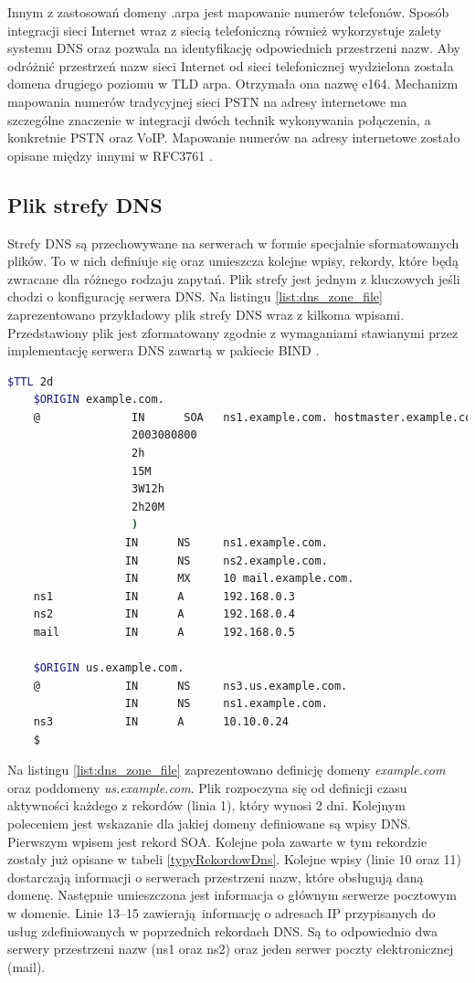 Innym z zastosowań domeny .arpa jest mapowanie numerów telefonów. Sposób integracji sieci Internet wraz z siecią telefoniczną również
wykorzystuje zalety systemu DNS oraz pozwala na identyfikację odpowiednich przestrzeni nazw. Aby odróżnić przestrzeń nazw sieci
Internet od sieci telefonicznej wydzielona została domena drugiego poziomu w TLD arpa. Otrzymała ona nazwę e164. Mechanizm mapowania
numerów tradycyjnej sieci
PSTN na adresy internetowe ma szczególne znaczenie w integracji dwóch technik wykonywania połączenia, a konkretnie PSTN oraz VoIP.
Mapowanie numerów na adresy internetowe zostało opisane między innymi w RFC3761 \cite{RFC3761}.

\subsection{Plik strefy DNS}
Strefy DNS są przechowywane na serwerach w formie specjalnie sformatowanych plików. To w nich definiuje się oraz umieszcza kolejne
wpisy, rekordy, które będą zwracane dla różnego rodzaju zapytań. Plik strefy jest jednym z kluczowych jeśli chodzi o konfigurację
serwera DNS. Na listingu \ref{list:dns_zone_file} zaprezentowano przykładowy plik strefy DNS wraz z kilkoma wpisami. Przedstawiony
plik jest zformatowany zgodnie z wymaganiami stawianymi przez implementację serwera DNS zawartą w pakiecie
BIND \cite{Liu:2006:DB:1197828, isc, domain_example}.

\begin{lstlisting}[label={list:dns_zone_file},captionpos=b,caption=Przykładowy plik strefy DNS.,language=bash]
	$TTL 2d
	$ORIGIN example.com.
	@              IN      SOA   ns1.example.com. hostmaster.example.com. (
	               2003080800
	               2h
	               15M
	               3W12h
	               2h20M
	               )
	              IN      NS     ns1.example.com.
	              IN      NS     ns2.example.com.
	              IN      MX     10 mail.example.com.
	ns1           IN      A      192.168.0.3
	ns2           IN      A      192.168.0.4
	mail          IN      A      192.168.0.5

	$ORIGIN us.example.com.
	@             IN      NS     ns3.us.example.com.
	              IN      NS     ns1.example.com.
	ns3           IN      A      10.10.0.24
	$
\end{lstlisting}

Na listingu \ref{list:dns_zone_file} zaprezentowano definicję domeny \textit{example.com} oraz poddomeny \textit{us.example.com}.
Plik rozpoczyna się od definicji czasu aktywności każdego z rekordów (linia 1), który wynosi 2 dni. Kolejnym poleceniem jest
wskazanie dla jakiej domeny definiowane są wpisy DNS. Pierwszym wpisem jest rekord SOA. Kolejne pola zawarte w tym rekordzie
zostały już opisane w tabeli \ref{typyRekordowDns}. Kolejne wpisy (linie 10 oraz 11) dostarczają informacji o serwerach przestrzeni
nazw, które obsługują daną domenę. Następnie umieszczona jest informacja o głównym serwerze pocztowym w domenie. Linie 13--15
zawierają informację o adresach IP przypisanych do usług zdefiniowanych w poprzednich rekordach DNS. Są to odpowiednio dwa serwery
przestrzeni nazw (ns1 oraz ns2) oraz jeden serwer poczty elektronicznej (mail).

